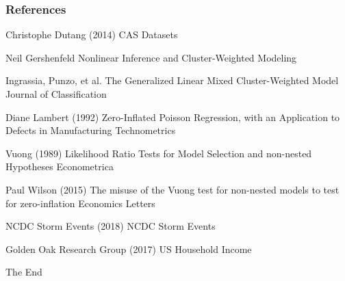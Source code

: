 \documentclass{beamer}
\begin{document}
\begin{frame}
\frametitle{References}
\footnotesize{
\begin{thebibliography}{99} %
\begin{tiny}
 Christophe Dutang (2014)
\newblock CAS Datasets 

 Neil Gershenfeld 
\newblock Nonlinear Inference and Cluster‐Weighted Modeling


 Ingrassia, Punzo, et  al. 
\newblock The Generalized Linear Mixed Cluster-Weighted Model
\newblock Journal of Classification


 Diane Lambert (1992) 
\newblock Zero-Inflated Poisson Regression, with an Application to Defects in Manufacturing 
\newblock Technometrics 

 Vuong (1989)
\newblock Likelihood Ratio Tests for Model Selection and non-nested Hypotheses
\newblock Econometrica


 Paul Wilson (2015)
\newblock The misuse of the Vuong test for non-nested models to test for zero-inflation
\newblock Economics Letters



 NCDC Storm Events (2018)
\newblock NCDC Storm Events


 Golden Oak Research Group (2017)
\newblock US Household Income
\end{tiny}

\end{thebibliography}
}
\end{frame}


\begin{frame}
\Huge{\centerline{The End}}
\end{frame}

\end{document}

